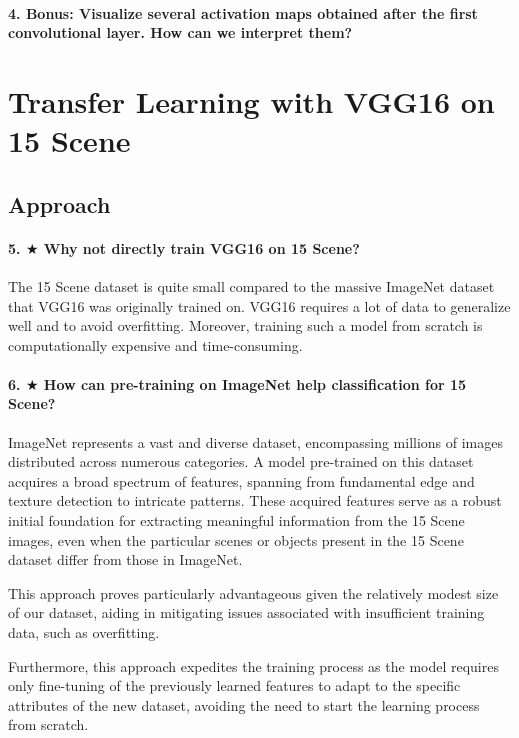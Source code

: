 \paragraph{4. \textbf{Bonus}: Visualize several activation maps obtained after the first convolutional layer. How can we interpret them?}

\section{Transfer Learning with VGG16 on 15 Scene}
\subsection{Approach}
\paragraph{5. $\bigstar$ Why not directly train VGG16 on 15 Scene?}
The 15 Scene dataset is quite small compared to the massive ImageNet dataset that VGG16 was originally trained on. VGG16 requires a lot of data to generalize well and to avoid overfitting. Moreover, training such a model from scratch is computationally expensive and time-consuming.


\paragraph{6. $\bigstar$ How can pre-training on ImageNet help classification for 15 Scene?}
ImageNet represents a vast and diverse dataset, encompassing millions of images distributed across numerous categories. A model pre-trained on this dataset acquires a broad spectrum of features, spanning from fundamental edge and texture detection to intricate patterns. These acquired features serve as a robust initial foundation for extracting meaningful information from the 15 Scene images, even when the particular scenes or objects present in the 15 Scene dataset differ from those in ImageNet. 

This approach proves particularly advantageous given the relatively modest size of our dataset, aiding in mitigating issues associated with insufficient training data, such as overfitting. 

Furthermore, this approach expedites the training process as the model requires only fine-tuning of the previously learned features to adapt to the specific attributes of the new dataset, avoiding the need to start the learning process from scratch.

